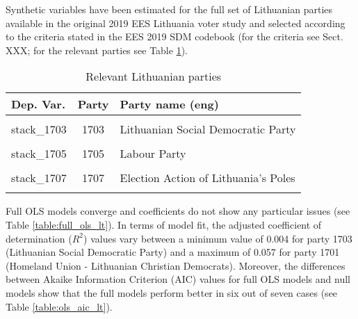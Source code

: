 \documentclass[
]{article}
\begin{document}
Synthetic variables have been estimated for the full set of Lithuanian parties available in the original
2019 EES Lithuania voter study and selected according to the criteria stated in the EES 2019 SDM codebook (for the criteria see Sect. XXX; for the relevant parties see Table \ref{table:relprty_tab_lt}).

\begin{table}[!h]

\caption{\label{tab:unnamed-chunk-108}Relevant Lithuanian parties \label{table:relprty_tab_lt}}
\centering
\begin{tabular}[t]{lcl}
\toprule
Dep. Var. & Party & Party name (eng)\\
\midrule
\cellcolor{gray!6}{stack\_1701} & \cellcolor{gray!6}{1701} & \cellcolor{gray!6}{Homeland Union - Lithuanian Christian Democrats}\\
stack\_1703 & 1703 & Lithuanian Social Democratic Party\\
\cellcolor{gray!6}{stack\_1706} & \cellcolor{gray!6}{1706} & \cellcolor{gray!6}{Liberal Movement}\\
stack\_1705 & 1705 & Labour Party\\
\cellcolor{gray!6}{stack\_1704} & \cellcolor{gray!6}{1704} & \cellcolor{gray!6}{Order and Justice}\\
\addlinespace
stack\_1707 & 1707 & Election Action of Lithuania's Poles\\
\cellcolor{gray!6}{stack\_1702} & \cellcolor{gray!6}{1702} & \cellcolor{gray!6}{Lithuanian Peasant and Greens Union}\\
\bottomrule
\end{tabular}
\end{table}

Full OLS models converge and coefficients do not show any particular issues (see Table
\ref{table:full_ols_lt}).
In terms of model fit, the adjusted coefficient of determination (\(R^2\)) values vary between
a minimum value of 0.004
for party 1703
(Lithuanian Social Democratic Party)
and a maximum of 0.057
for party 1701
(Homeland Union - Lithuanian Christian Democrats).
Moreover, the differences between Akaike Information Criterion (AIC) values for full OLS models and null
models show that the full models perform better in six out of seven cases (see Table \ref{table:ols_aic_lt}).
\end{document}
